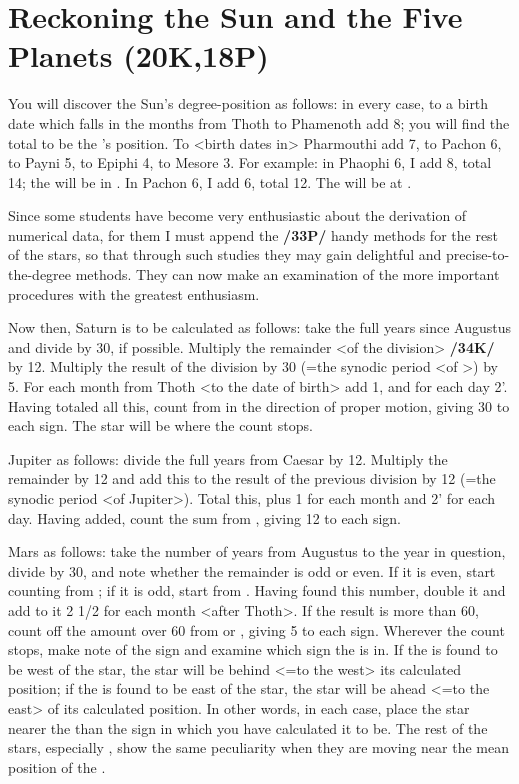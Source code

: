 \section{Reckoning the Sun and the Five Planets (20K,18P)}

You will discover the Sun’s degree-position as follows: in every case, to a birth date which falls in the months from Thoth to Phamenoth add 8\deg; you will find the total to be the \Sun’s position. To <birth dates in> Pharmouthi add 7\deg, to Pachon 6\deg, to Payni 5\deg, to Epiphi 4\deg, to Mesore 3\deg. For example: in Phaophi 6, I add 8\deg, total 14; the \Sun\xspace will be in \Libra\xspace 14\deg. In Pachon 6, I add 6\deg, total 12. The \Sun will be at \Taurus\xspace 12\deg.

Since some students have become very enthusiastic about the derivation of numerical data, for them I must append the \textbf{/33P/} handy methods for the rest of the stars, so that through such studies they may gain delightful and precise-to-the-degree methods. They can now make an examination of the more important procedures with the greatest enthusiasm.

Now then, Saturn is to be calculated as follows: take the full years since Augustus and divide by 30, if possible. Multiply the remainder <of the division> \textbf{/34K/} by 12\deg. Multiply the result of the division by 30 (=the synodic period <of \Saturn>) by 5\deg. For each month from Thoth <to the date of birth> add 1\deg, and for each day 2'. Having totaled all this, count from \Cancer\xspace in the direction of proper motion, giving 30\deg\xspace to each sign. The star will be where the count stops.

Jupiter as follows: divide the full years from Caesar by 12. Multiply the remainder by 12\deg\xspace and add
this to the result of the previous division by 12 (=the synodic period <of Jupiter>). Total this, plus 1\deg\xspace for each month and 2' for each day. Having added, count the sum from \Taurus, giving 12 to each sign.

Mars as follows: take the number of years from Augustus to the year in question, divide by 30, and note whether the remainder is odd or even. If it is even, start counting from \Aries; if it is odd, start from \Libra. Having found this number, double it and add to it 2 1/2 for each month <after Thoth>. If the result is more than 60, count off the amount over 60 from \Libra\xspace or \Aries, giving 5 to each sign. Wherever the count stops, make note of the sign and examine which sign the \Sun\xspace is in. If the \Sun\xspace is found to be west of the star, the star will be behind <=to the west> its calculated position; if the \Sun\xspace is found to be east of the star, the star will be ahead <=to the east> of its calculated position. In other words, in each case, place the
star nearer the \Sun\xspace than the sign in which you have calculated it to be. The rest of the stars, especially \Venus, show the same peculiarity when they are moving near the mean position of the \Sun.

